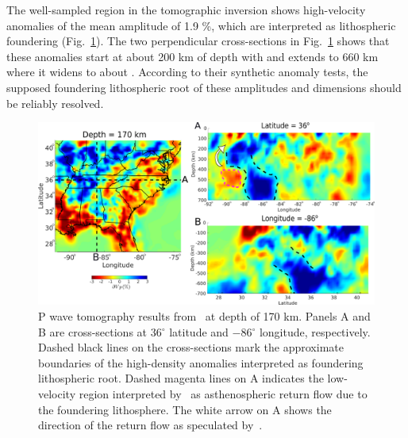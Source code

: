 \documentclass[draft,linenumbers]{agujournal2018}
\begin{document}
    The well-sampled region in the tomographic inversion shows
    high-velocity anomalies of the mean amplitude of 1.9 \%, which are interpreted as lithospheric foundering (Fig.~\ref{fig_tomo}). The two perpendicular cross-sections in Fig.~\ref{fig_tomo} shows that these anomalies start at about 200 km of depth with   and extends to 660 km where it widens to about . According to their synthetic anomaly tests, the supposed foundering lithospheric root of these amplitudes and dimensions should be reliably resolved.
%
\begin{figure}[ht]
    \centering
    \includegraphics[width=\linewidth]{figures/figure_tomography.png}
    \caption{P wave tomography results from~\citep{Biryol_2016} at depth of 170 km. Panels A and B are cross-sections at 36$^\circ$ latitude and $-$86$^{\circ}$ longitude, respectively. Dashed black lines on the cross-sections mark the approximate boundaries of the high-density anomalies interpreted as foundering lithospheric root. Dashed magenta lines on A indicates the low-velocity region interpreted by~\citet{Biryol_2016} as asthenospheric return flow due to the foundering lithosphere. The white arrow on A shows the direction of the return flow as speculated by~\citet{Biryol_2016}.}
    \label{fig_tomo}
 \end{figure}
\end{document}
